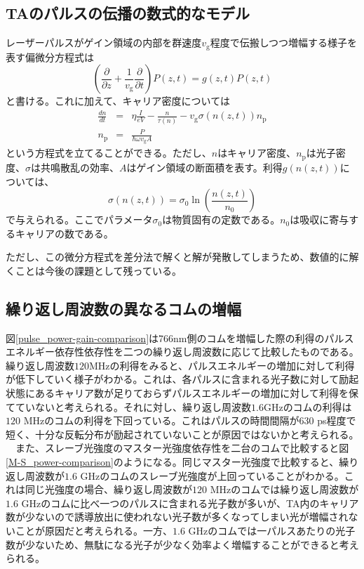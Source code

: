 \documentclass[uplatex, dvipdfmx, a4paper, report, papersize, 11pt]{jsbook}
\begin{document}
\subsection{TAのパルスの伝播の数式的なモデル}
レーザーパルスがゲイン領域の内部を群速度$v_\mathrm{g}$程度で伝搬しつつ増幅する様子を表す偏微分方程式は
\begin{equation}
  \left(\frac{\partial}{\partial z} + \frac{1}{v_{\mathrm{g}}}\frac{\partial}{\partial t}\right)P(z,t) = g(z,t)P(z,t)
\end{equation}
と書ける。これに加えて、キャリア密度については
\begin{eqnarray}
  \frac{dn}{dt} &=& \eta \frac{I}{eV} - \frac{n}{\tau(n)}-v_{\mathrm{g}}\sigma(n(z,t))n_{\mathrm{p}}\\
  n_{\mathrm{p}} &=& \frac{P}{\hbar\omega v_{\mathrm{g}}A}
\end{eqnarray}
という方程式を立てることができる。ただし、$n$はキャリア密度、$n_{\mathrm{p}}$は光子密度、$\sigma$は共鳴散乱の効率、$A$はゲイン領域の断面積を表す。利得$g(n(z,t))$については、　
\begin{equation}
  \sigma(n(z,t)) = \sigma_0 \ln{\left( \frac{n(z,t)}{n_0}\right)}
\end{equation}
で与えられる。ここでパラメータ$\sigma_0$は物質固有の定数である。$n_0$は吸収に寄与するキャリアの数である。

ただし、この微分方程式を差分法で解くと解が発散してしまうため、数値的に解くことは今後の課題として残っている。
\subsection{繰り返し周波数の異なるコムの増幅}

図\ref{pulse_power-gain-comparison}は766nm側のコムを増幅した際の利得のパルスエネルギー依存性依存性を二つの繰り返し周波数に応じて比較したものである。繰り返し周波数$120 \mathrm{MHz}$の利得をみると、パルスエネルギーの増加に対して利得が低下していく様子がわかる。これは、各パルスに含まれる光子数に対して励起状態にあるキャリア数が足りておらずパルスエネルギーの増加に対して利得を保てていないと考えられる。それに対し、繰り返し周波数$1.6 \mathrm{GHz}$のコムの利得は$120$ MHzのコムの利得を下回っている。これはパルスの時間間隔が$630$ ps程度で短く、十分な反転分布が励起されていないことが原因ではないかと考えられる。\\
　また、スレーブ光強度のマスター光強度依存性を二台のコムで比較すると図\ref{M-S_power-comparison}のようになる。同じマスター光強度で比較すると、繰り返し周波数が$1.6$ GHzのコムのスレーブ光強度が上回っていることがわかる。これは同じ光強度の場合、繰り返し周波数が$120$ MHzのコムでは繰り返し周波数が$1.6$ GHzのコムに比べ一つのパルスに含まれる光子数が多いが、TA内のキャリア数が少ないので誘導放出に使われない光子数が多くなってしまい光が増幅されないことが原因だと考えられる。一方、$1.6$ GHzのコムでは一パルスあたりの光子数が少ないため、無駄になる光子が少なく効率よく増幅することができると考えられる。
\end{document}
